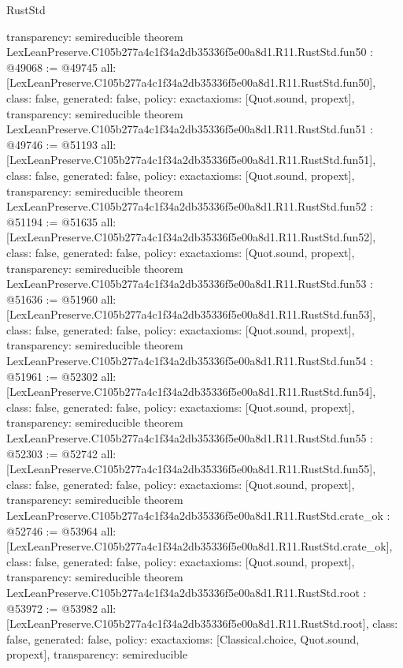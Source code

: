 \begin{lexlean}{RustStd}
\begin{coremodule}
{  transparency: semireducible
}
theorem LexLeanPreserve.C105b277a4c1f34a2db35336f5e00a8d1.R11.RustStd.fun50 : @49068 := @49745 {
  all: [LexLeanPreserve.C105b277a4c1f34a2db35336f5e00a8d1.R11.RustStd.fun50],
  class: false,
  generated: false,
  policy: exact{axioms: [Quot.sound, propext]},
  transparency: semireducible
}
theorem LexLeanPreserve.C105b277a4c1f34a2db35336f5e00a8d1.R11.RustStd.fun51 : @49746 := @51193 {
  all: [LexLeanPreserve.C105b277a4c1f34a2db35336f5e00a8d1.R11.RustStd.fun51],
  class: false,
  generated: false,
  policy: exact{axioms: [Quot.sound, propext]},
  transparency: semireducible
}
theorem LexLeanPreserve.C105b277a4c1f34a2db35336f5e00a8d1.R11.RustStd.fun52 : @51194 := @51635 {
  all: [LexLeanPreserve.C105b277a4c1f34a2db35336f5e00a8d1.R11.RustStd.fun52],
  class: false,
  generated: false,
  policy: exact{axioms: [Quot.sound, propext]},
  transparency: semireducible
}
theorem LexLeanPreserve.C105b277a4c1f34a2db35336f5e00a8d1.R11.RustStd.fun53 : @51636 := @51960 {
  all: [LexLeanPreserve.C105b277a4c1f34a2db35336f5e00a8d1.R11.RustStd.fun53],
  class: false,
  generated: false,
  policy: exact{axioms: [Quot.sound, propext]},
  transparency: semireducible
}
theorem LexLeanPreserve.C105b277a4c1f34a2db35336f5e00a8d1.R11.RustStd.fun54 : @51961 := @52302 {
  all: [LexLeanPreserve.C105b277a4c1f34a2db35336f5e00a8d1.R11.RustStd.fun54],
  class: false,
  generated: false,
  policy: exact{axioms: [Quot.sound, propext]},
  transparency: semireducible
}
theorem LexLeanPreserve.C105b277a4c1f34a2db35336f5e00a8d1.R11.RustStd.fun55 : @52303 := @52742 {
  all: [LexLeanPreserve.C105b277a4c1f34a2db35336f5e00a8d1.R11.RustStd.fun55],
  class: false,
  generated: false,
  policy: exact{axioms: [Quot.sound, propext]},
  transparency: semireducible
}
theorem LexLeanPreserve.C105b277a4c1f34a2db35336f5e00a8d1.R11.RustStd.crate_ok : @52746 := @53964 {
  all: [LexLeanPreserve.C105b277a4c1f34a2db35336f5e00a8d1.R11.RustStd.crate_ok],
  class: false,
  generated: false,
  policy: exact{axioms: [Quot.sound, propext]},
  transparency: semireducible
}
theorem LexLeanPreserve.C105b277a4c1f34a2db35336f5e00a8d1.R11.RustStd.root : @53972 := @53982 {
  all: [LexLeanPreserve.C105b277a4c1f34a2db35336f5e00a8d1.R11.RustStd.root],
  class: false,
  generated: false,
  policy: exact{axioms: [Classical.choice, Quot.sound, propext]},
  transparency: semireducible
}


\end{coremodule}
\end{lexlean}
